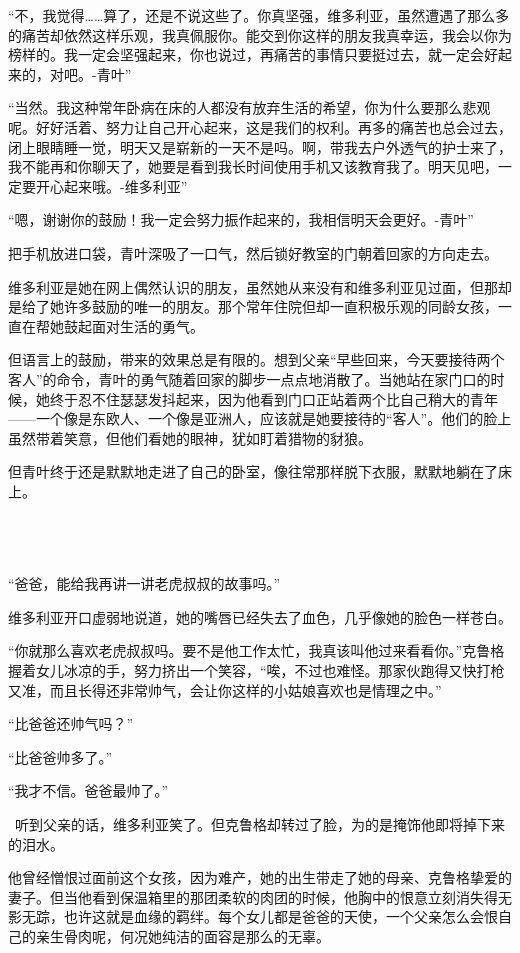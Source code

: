 “不，我觉得……算了，还是不说这些了。你真坚强，维多利亚，虽然遭遇了那么多的痛苦却依然这样乐观，我真佩服你。能交到你这样的朋友我真幸运，我会以你为榜样的。我一定会坚强起来，你也说过，再痛苦的事情只要挺过去，就一定会好起来的，对吧。-青叶”

“当然。我这种常年卧病在床的人都没有放弃生活的希望，你为什么要那么悲观呢。好好活着、努力让自己开心起来，这是我们的权利。再多的痛苦也总会过去，闭上眼睛睡一觉，明天又是崭新的一天不是吗。啊，带我去户外透气的护士来了，我不能再和你聊天了，她要是看到我长时间使用手机又该教育我了。明天见吧，一定要开心起来哦。-维多利亚”

“嗯，谢谢你的鼓励！我一定会努力振作起来的，我相信明天会更好。-青叶”

把手机放进口袋，青叶深吸了一口气，然后锁好教室的门朝着回家的方向走去。

维多利亚是她在网上偶然认识的朋友，虽然她从来没有和维多利亚见过面，但那却是给了她许多鼓励的唯一的朋友。那个常年住院但却一直积极乐观的同龄女孩，一直在帮她鼓起面对生活的勇气。

但语言上的鼓励，带来的效果总是有限的。想到父亲“早些回来，今天要接待两个客人”的命令，青叶的勇气随着回家的脚步一点点地消散了。当她站在家门口的时候，她终于忍不住瑟瑟发抖起来，因为他看到门口正站着两个比自己稍大的青年——一个像是东欧人、一个像是亚洲人，应该就是她要接待的“客人”。他们的脸上虽然带着笑意，但他们看她的眼神，犹如盯着猎物的豺狼。

但青叶终于还是默默地走进了自己的卧室，像往常那样脱下衣服，默默地躺在了床上。

 \section*{}

“爸爸，能给我再讲一讲老虎叔叔的故事吗。”

维多利亚开口虚弱地说道，她的嘴唇已经失去了血色，几乎像她的脸色一样苍白。

“你就那么喜欢老虎叔叔吗。要不是他工作太忙，我真该叫他过来看看你。”克鲁格握着女儿冰凉的手，努力挤出一个笑容，“唉，不过也难怪。那家伙跑得又快打枪又准，而且长得还非常帅气，会让你这样的小姑娘喜欢也是情理之中。”

“比爸爸还帅气吗？” 

“比爸爸帅多了。”

“我才不信。爸爸最帅了。”

 听到父亲的话，维多利亚笑了。但克鲁格却转过了脸，为的是掩饰他即将掉下来的泪水。

他曾经憎恨过面前这个女孩，因为难产，她的出生带走了她的母亲、克鲁格挚爱的妻子。但当他看到保温箱里的那团柔软的肉团的时候，他胸中的恨意立刻消失得无影无踪，也许这就是血缘的羁绊。每个女儿都是爸爸的天使，一个父亲怎么会恨自己的亲生骨肉呢，何况她纯洁的面容是那么的无辜。

